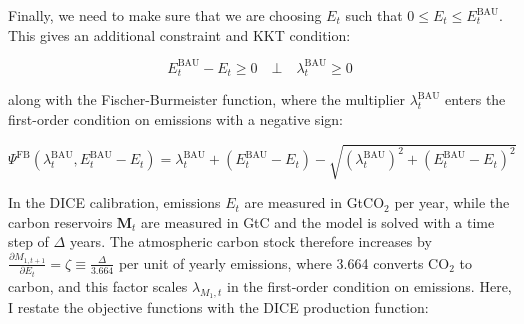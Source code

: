 Finally, we need to make sure that we are choosing \(E_t\) such that \(0\leq E_t \leq E_t^{\text{BAU}}\). This gives an additional constraint and KKT condition:

\begin{equation}
    E_t^{\text{BAU}} - E_t \geq 0 
    \quad \bot \quad
    \lambda_t^{\text{BAU}} \geq 0
\end{equation}

along with the Fischer-Burmeister function, where the multiplier \(\lambda_t^{\text{BAU}}\) enters the first-order condition on emissions with a negative sign:

\begin{equation}
    \Psi^{\text{FB}}(\lambda_t^{\text{BAU}}, E_t^{\text{BAU}} - E_t) =
    \lambda_t^{\text{BAU}} + (E_t^{\text{BAU}} - E_t) 
        - \sqrt{(\lambda_t^{\text{BAU}})^2 + (E_t^{\text{BAU}} - E_t)^2}
\end{equation}

In the DICE calibration, emissions \(E_t\) are measured in GtCO\(_2\) per year, while the carbon reservoirs \(\bm{M}_t\) are measured in GtC and the model is solved with a time step of \(\Delta\) years. The atmospheric carbon stock therefore increases by \(\frac{\partial M_{1,t+1}}{\partial E_t} = \zeta \equiv \frac{\Delta}{3.664}\) per unit of yearly emissions, where 3.664 converts CO\(_2\) to carbon, and this factor scales \(\lambda_{M_1,t}\) in the first-order condition on emissions. Here, I restate the objective functions with the DICE production function:

